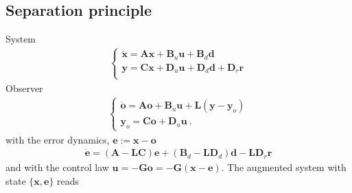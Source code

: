 \documentclass[letterpaper,10pt,english]{jupyterBook}
\begin{document}
\subsection{Separation principle}
\label{\detokenize{ch/control/optimal-control-regulator-observer:separation-principle}}\label{\detokenize{ch/control/optimal-control-regulator-observer:control-controller-observer-separation-principle}}
\sphinxAtStartPar
System
\begin{equation*}
\begin{split}\begin{cases}
  \dot{\mathbf{x}} = \mathbf{A} \mathbf{x} + \mathbf{B}_u \mathbf{u} + \mathbf{B}_d \mathbf{d} \\
       \mathbf{y}  = \mathbf{C} \mathbf{x} + \mathbf{D}_u \mathbf{u} + \mathbf{D}_d \mathbf{d} + \mathbf{D}_r \mathbf{r} \\
\end{cases}\end{split}
\end{equation*}
\sphinxAtStartPar
Observer
\begin{equation*}
\begin{split}\begin{cases}
  \dot{\mathbf{o}} = \mathbf{A} \mathbf{o} + \mathbf{B}_u \mathbf{u} + \mathbf{L} ( \mathbf{y} - \mathbf{y}_o ) \\
       \mathbf{y}_o= \mathbf{C} \mathbf{o} + \mathbf{D}_u \mathbf{u} \ .
\end{cases}\end{split}
\end{equation*}
\sphinxAtStartPar
with the error dynamics, \(\mathbf{e} := \mathbf{x} - \mathbf{o}\)
\begin{equation*}
\begin{split}
  \dot{\mathbf{e}} = \left( \mathbf{A} - \mathbf{L} \mathbf{C} \right) \mathbf{e} + \left( \mathbf{B}_d - \mathbf{L} \mathbf{D}_d \right) \mathbf{d} - \mathbf{L} \mathbf{D}_r \mathbf{r} 
\end{split}
\end{equation*}
\sphinxAtStartPar
and with the control law \(\mathbf{u} = - \mathbf{G} \mathbf{o} = - \mathbf{G} \left( \mathbf{x} - \mathbf{e} \right)\). The augmented system with state \(\{ \mathbf{x}, \mathbf{e} \}\) reads
\end{document}
